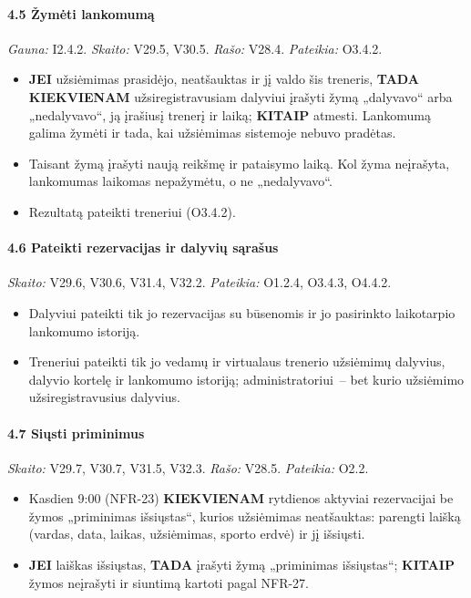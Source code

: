 \paragraph{4.5 Žymėti lankomumą}\mbox{}\par
{\small \textit{Gauna:} I2.4.2. \textit{Skaito:} V29.5, V30.5. \textit{Rašo:} V28.4. \textit{Pateikia:} O3.4.2.}
\begin{itemize}
  \item \textbf{JEI} užsiėmimas prasidėjo, neatšauktas ir jį valdo šis treneris, \textbf{TADA} \textbf{KIEKVIENAM} užsiregistravusiam dalyviui įrašyti žymą „dalyvavo“ arba „nedalyvavo“, ją įrašiusį trenerį ir laiką; \textbf{KITAIP} atmesti. Lankomumą galima žymėti ir tada, kai užsiėmimas sistemoje nebuvo pradėtas.
  \item Taisant žymą įrašyti naują reikšmę ir pataisymo laiką. Kol žyma neįrašyta, lankomumas laikomas nepažymėtu, o ne „nedalyvavo“.
  \item Rezultatą pateikti treneriui (O3.4.2).
\end{itemize}
\paragraph{4.6 Pateikti rezervacijas ir dalyvių sąrašus}\mbox{}\par
{\small \textit{Skaito:} V29.6, V30.6, V31.4, V32.2. \textit{Pateikia:} O1.2.4, O3.4.3, O4.4.2.}
\begin{itemize}
  \item Dalyviui pateikti tik jo rezervacijas su būsenomis ir jo pasirinkto laikotarpio lankomumo istoriją.
  \item Treneriui pateikti tik jo vedamų ir virtualaus trenerio užsiėmimų dalyvius, dalyvio kortelę ir lankomumo istoriją; administratoriui~– bet kurio užsiėmimo užsiregistravusius dalyvius.
\end{itemize}
\paragraph{4.7 Siųsti priminimus}\mbox{}\par
{\small \textit{Skaito:} V29.7, V30.7, V31.5, V32.3. \textit{Rašo:} V28.5. \textit{Pateikia:} O2.2.}
\begin{itemize}
  \item Kasdien 9:00 (NFR-23) \textbf{KIEKVIENAM} rytdienos aktyviai rezervacijai be žymos „priminimas išsiųstas“, kurios užsiėmimas neatšauktas: parengti laišką (vardas, data, laikas, užsiėmimas, sporto erdvė) ir jį išsiųsti.
  \item \textbf{JEI} laiškas išsiųstas, \textbf{TADA} įrašyti žymą „priminimas išsiųstas“; \textbf{KITAIP} žymos neįrašyti ir siuntimą kartoti pagal NFR-27.
\end{itemize}
